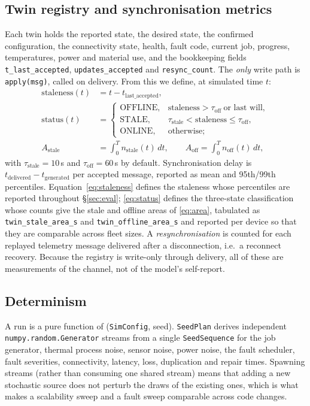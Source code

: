 \documentclass[preprint,12pt,authoryear,nopreprintline]{elsarticle}
\begin{document}
\subsection{Twin registry and synchronisation metrics}
\label{sec:twin}
Each twin holds the reported state, the desired state, the confirmed
configuration, the connectivity state, health, fault code, current job, progress,
temperatures, power and material use, and the bookkeeping fields
\texttt{t\_last\_accepted}, \texttt{updates\_accepted} and \texttt{resync\_count}.
The \emph{only} write path is \texttt{apply(msg)}, called on delivery.
From this we define, at simulated time $t$:
\begin{align}
\mathrm{staleness}(t) &= t - t_{\mathrm{last\_accepted}} , \label{eq:staleness}\\
\mathrm{status}(t) &=
  \begin{cases}
    \mathrm{OFFLINE}, & \mathrm{staleness} > \tau_{\mathrm{off}} \ \text{or last will},\\
    \mathrm{STALE}, & \tau_{\mathrm{stale}} < \mathrm{staleness}
                      \le \tau_{\mathrm{off}},\\
    \mathrm{ONLINE}, & \text{otherwise};
  \end{cases} \label{eq:status}\\
A_{\mathrm{stale}} &= \int_0^{T} n_{\mathrm{stale}}(t)\,dt , \qquad
A_{\mathrm{off}} = \int_0^{T} n_{\mathrm{off}}(t)\,dt , \label{eq:area}
\end{align}
with $\tau_{\mathrm{stale}} = 10$\,s and $\tau_{\mathrm{off}} = 60$\,s by default.
Synchronisation delay is $t_{\mathrm{delivered}} - t_{\mathrm{generated}}$ per
accepted message, reported as mean and 95th/99th percentiles.
Equation~\eqref{eq:staleness} defines the staleness whose percentiles are reported
throughout \S\ref{sec:eval}; \eqref{eq:status} defines the three-state
classification whose counts give the stale and offline areas of
\eqref{eq:area}, tabulated as \texttt{twin\_stale\_area\_s} and
\texttt{twin\_offline\_area\_s} and reported per device so that they are
comparable across fleet sizes.
A \emph{resynchronisation} is counted for each replayed telemetry message
delivered after a disconnection, i.e.\ a reconnect recovery.
Because the registry is write-only through delivery, all of these are
measurements of the channel, not of the model's self-report.

\subsection{Determinism}
\label{sec:determinism}
A run is a pure function of (\texttt{SimConfig}, seed).
\texttt{SeedPlan} derives independent \texttt{numpy.random.Generator} streams
from a single \texttt{SeedSequence} for the job generator, thermal process noise,
sensor noise, power noise, the fault scheduler, fault severities, connectivity,
latency, loss, duplication and repair times.
Spawning streams (rather than consuming one shared stream) means that adding a
new stochastic source does not perturb the draws of the existing ones, which is
what makes a scalability sweep and a fault sweep comparable across code changes.
\end{document}
